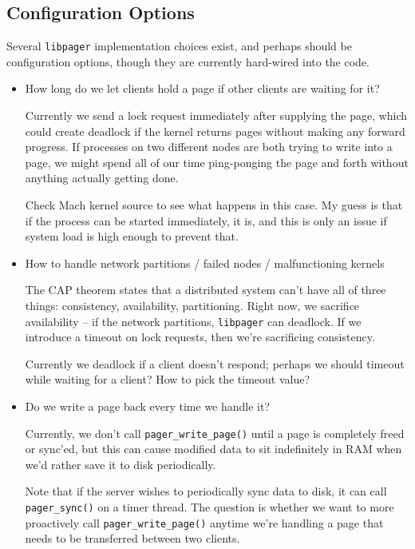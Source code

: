 \documentclass{article}
\def\libpager{{\tt libpager}\xspace}
\begin{document}
\subsection{Configuration Options}

Several \libpager implementation choices exist, and perhaps should be configuration options,
though they are currently hard-wired into the code.

\begin{itemize}

\item How long do we let clients hold a page if other clients are waiting for it?

  Currently we send a lock request immediately after supplying the
  page, which could create deadlock if the kernel returns pages
  without making any forward progress.  If processes on two different
  nodes are both trying to write into a page, we might spend all of
  our time ping-ponging the page and forth without anything actually
  getting done.

  Check Mach kernel source to see what happens in this case.  My guess
  is that if the process can be started immediately, it is, and this
  is only an issue if system load is high enough to prevent that.

\item How to handle network partitions / failed nodes / malfunctioning kernels

  The CAP theorem states that a distributed system can't have all of
  three things: consistency, availability, partitioning.  Right now,
  we sacrifice availability -- if the network partitions, \libpager
  can deadlock.  If we introduce a timeout on lock requests, then
  we're sacrificing consistency.

  Currently we deadlock if a client doesn't respond; perhaps we should
  timeout while waiting for a client?  How to pick the timeout value?

\item Do we write a page back every time we handle it?

  Currently, we don't call {\tt pager_write_page()} until a page is
  completely freed or sync'ed, but this can cause modified data to sit
  indefinitely in RAM when we'd rather save it to disk periodically.

  Note that if the server wishes to periodically sync data to disk, it
  can call {\tt pager_sync()} on a timer thread.  The question is
  whether we want to more proactively call {\tt pager_write_page()}
  anytime we're handling a page that needs to be transferred between
  two clients.


\end{itemize}
\end{document}
